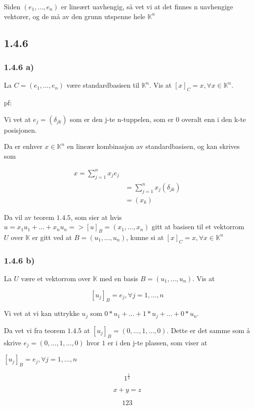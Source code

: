 \documentclass[11pt]{article}
\begin{document}
Siden $(e_1,...,e_n)$ er lineært uavhengig, så vet vi at det finnes n uavhengige vektorer, og de må av den grunn utspenne hele $\mathbb{K}^n$




\subsection{1.4.6}
\subsubsection*{1.4.6 a)}

La $C = (e_1,..., e_n)$ være standardbasisen til $\mathbb{K}^n$. Vis at $[ x ]_C = x, \forall x \in \mathbb{K}^n$.

pf:

Vi vet at $e_j = (\delta_{jk})$ som er den j-te n-tuppelen, som er 0 overalt enn i den k-te posisjonen.

Da er enhver $x \in \mathbb{K}^n$ en lineær kombinasjon av standardbasisen, og kan skrives som

\begin{align*}
    x = \sum_{j=1}^{n} x_j e_j \\
    &= \sum_{j=1}^{n} x_j (\delta_{jk}) \\
    &= (x_k)
\end{align*}

\vspace{1em}

Da vil av teorem $1.4.5$, som sier at hvis $u = x_1 u_1+...+x_n u_n => [u]_B = (x_1,...,x_n)$ gitt at basisen til et vektorrom $U$ over $\mathbb{K}$ er gitt ved at $B=(u_1,...,u_n)$, kunne si at
$[x]_C = x,  \forall x \in \mathbb{K}^n$



\subsubsection*{1.4.6 b)}

La $U$ være et vektorrom over $\mathbb{K}$ med en basis $B=(u_1,...,u_n)$. Vis at 

$$
[u_j]_B = e_j, \forall j =1,...,n
$$

Vi vet at vi kan uttrykke $u_j$ som $0 * u_1 + ... + 1 * u_j + ... + 0 * u_n$.

Da vet vi fra teorem $1.4.5$  at $[u_j]_B = (0,...,1,...,0)$. Dette er det samme som å skrive $e_j = (0,...,1,...,0)$ hvor $1$ er i den j-te plassen, som viser at

$[u_j]_B = e_j, \forall j = 1,...,n$



\[
     1^{ \frac{1} {2} } 
\] 

\[
     x + y = z
\] 

\[
     123
\] 
\end{document}

